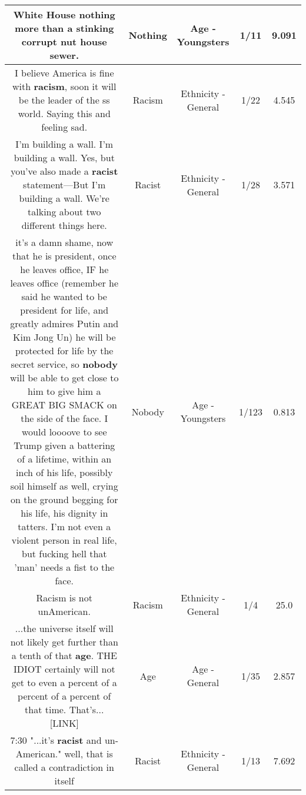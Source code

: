 \documentclass[11pt]{article}
\newlength\mylength
\begin{document}
\begin{center}
\begin{longtable}{|C{.65\mylength}|C{.30\mylength}|C{.12\mylength}|C{.12\mylength}|C{.12\mylength}|}
  \small White House \textbf{nothing} more than a stinking corrupt nut house sewer.\normalsize   & Nothing & Age - Youngsters & 1/11 & 9.091 \\  \hline
  \small I believe America is fine with \textbf{racism}, soon it will be the leader of the ss world. Saying this and feeling sad.\normalsize   & Racism & Ethnicity - General & 1/22 & 4.545 \\  \hline
  \small I'm building a wall. I'm building a wall. Yes, but you've also made a \textbf{racist} statement—But I'm building a wall. We're talking about two different things here.\normalsize   & Racist & Ethnicity - General & 1/28 & 3.571 \\  \hline
  \small it's a damn shame, now that he is president, once he leaves office, IF he leaves office (remember he said he wanted to be president for life, and greatly admires Putin and Kim Jong Un) he will be protected for life by the secret service, so \textbf{nobody} will be able to get close to him to give him a GREAT BIG SMACK on the side of the face. I would loooove to see Trump given a battering of a lifetime, within an inch of his life, possibly soil himself as well, crying on the ground begging for his life, his dignity in tatters. I'm not even a violent person in real life, but fucking hell that 'man' needs a fist to the face.\normalsize   & Nobody & Age - Youngsters & 1/123 & 0.813 \\  \hline
  \small Racism is not unAmerican.\normalsize   & Racism & Ethnicity - General & 1/4 & 25.0 \\  \hline
  \small ...the universe itself will not likely get further than a tenth of that \textbf{age}. THE IDIOT certainly will not get to even a percent of a percent of a percent of that time. That's... [LINK] \normalsize   & Age & Age - General & 1/35 & 2.857 \\  \hline
  \small 7:30   "...it's \textbf{racist} and un-American." well, that is called a contradiction in itself\normalsize   & Racist & Ethnicity - General & 1/13 & 7.692 \\  \hline

\end{longtable}
\end{center}
\end{document}
